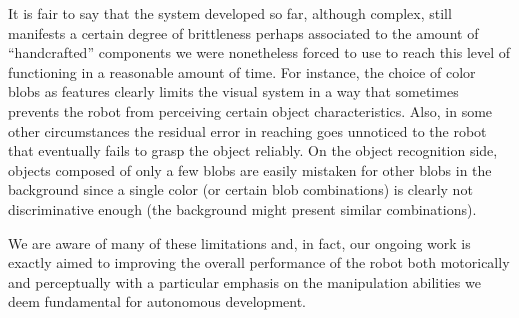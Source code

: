 It is fair to say that the system developed so far, although complex, still manifests a certain degree of brittleness perhaps associated to the amount of ``handcrafted'' components we were nonetheless forced to use to reach this level of functioning in a reasonable amount of time. For instance, the choice of color blobs as features clearly limits the visual system in a way that sometimes prevents the robot from perceiving certain object characteristics. Also, in some other circumstances the residual error in reaching goes unnoticed to the robot that eventually fails to grasp the object reliably. On the object recognition side, objects composed of only a few blobs are easily mistaken for other blobs in the background since a single color (or certain blob combinations) is clearly not discriminative enough (the background might present similar combinations). 

We are aware of many of these limitations and, in fact, our ongoing work is exactly aimed to improving the overall performance of the robot both motorically and perceptually with a particular emphasis on the manipulation abilities we deem fundamental for autonomous development.




